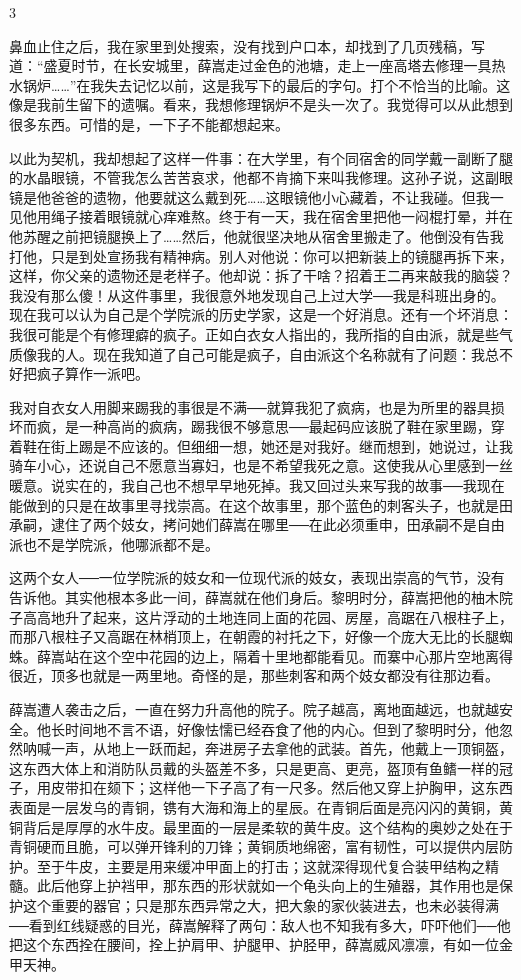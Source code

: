 3 

鼻血止住之后，我在家里到处搜索，没有找到户口本，却找到了几页残稿，写道：“盛夏时节，在长安城里，薛嵩走过金色的池塘，走上一座高塔去修理一具热水锅炉……”在我失去记忆以前，这是我写下的最后的字句。打个不恰当的比喻。这像是我前生留下的遗嘱。看来，我想修理锅炉不是头一次了。我觉得可以从此想到很多东西。可惜的是，一下子不能都想起来。 

以此为契机，我却想起了这样一件事：在大学里，有个同宿舍的同学戴一副断了腿的水晶眼镜，不管我怎么苦苦哀求，他都不肯摘下来叫我修理。这孙子说，这副眼镜是他爸爸的遗物，他要就这么戴到死……这眼镜他小心藏着，不让我碰。但我一见他用绳子接着眼镜就心痒难熬。终于有一天，我在宿舍里把他一闷棍打晕，并在他苏醒之前把镜腿换上了……然后，他就很坚决地从宿舍里搬走了。他倒没有告我打他，只是到处宣扬我有精神病。别人对他说：你可以把新装上的镜腿再拆下来，这样，你父亲的遗物还是老样子。他却说：拆了干啥？招着王二再来敲我的脑袋？我没有那么傻！从这件事里，我很意外地发现自己上过大学──我是科班出身的。现在我可以认为自己是个学院派的历史学家，这是一个好消息。还有一个坏消息：我很可能是个有修理癖的疯子。正如白衣女人指出的，我所指的自由派，就是些气质像我的人。现在我知道了自己可能是疯子，自由派这个名称就有了问题：我总不好把疯子算作一派吧。 

我对自衣女人用脚来踢我的事很是不满──就算我犯了疯病，也是为所里的器具损坏而疯，是一种高尚的疯病，踢我很不够意思──最起码应该脱了鞋在家里踢，穿着鞋在街上踢是不应该的。但细细一想，她还是对我好。继而想到，她说过，让我骑车小心，还说自己不愿意当寡妇，也是不希望我死之意。这使我从心里感到一丝暖意。说实在的，我自己也不想早早地死掉。我又回过头来写我的故事──我现在能做到的只是在故事里寻找崇高。在这个故事里，那个蓝色的刺客头子，也就是田承嗣，逮住了两个妓女，拷问她们薛嵩在哪里──在此必须重申，田承嗣不是自由派也不是学院派，他哪派都不是。 

这两个女人──一位学院派的妓女和一位现代派的妓女，表现出崇高的气节，没有告诉他。其实他根本多此一间，薛嵩就在他们身后。黎明时分，薛嵩把他的柚木院子高高地升了起来，这片浮动的土地连同上面的花园、房屋，高踞在八根柱子上，而那八根柱子又高踞在林梢顶上，在朝霞的衬托之下，好像一个庞大无比的长腿蜘蛛。薛嵩站在这个空中花园的边上，隔着十里地都能看见。而寨中心那片空地离得很近，顶多也就是一两里地。奇怪的是，那些刺客和两个妓女都没有往那边看。 

薛嵩遭人袭击之后，一直在努力升高他的院子。院子越高，离地面越远，也就越安全。他长时间地不言不语，好像怯懦已经吞食了他的内心。但到了黎明时分，他忽然呐喊一声，从地上一跃而起，奔进房子去拿他的武装。首先，他戴上一顶铜盔，这东西大体上和消防队员戴的头盔差不多，只是更高、更亮，盔顶有鱼鳍一样的冠子，用皮带扣在颏下；这样他一下子高了有一尺多。然后他又穿上护胸甲，这东西表面是一层发乌的青铜，镌有大海和海上的星辰。在青铜后面是亮闪闪的黄铜，黄铜背后是厚厚的水牛皮。最里面的一层是柔软的黄牛皮。这个结构的奥妙之处在于青铜硬而且脆，可以弹开锋利的刀锋；黄铜质地绵密，富有韧性，可以提供内层防护。至于牛皮，主要是用来缓冲甲面上的打击；这就深得现代复合装甲结构之精髓。此后他穿上护裆甲，那东西的形状就如一个龟头向上的生殖器，其作用也是保护这个重要的器官；只是那东西异常之大，把大象的家伙装进去，也未必装得满──看到红线疑惑的目光，薛嵩解释了两句：敌人也不知我有多大，吓吓他们──他把这个东西拴在腰间，拴上护肩甲、护腿甲、护胫甲，薛嵩威风凛凛，有如一位金甲天神。 

